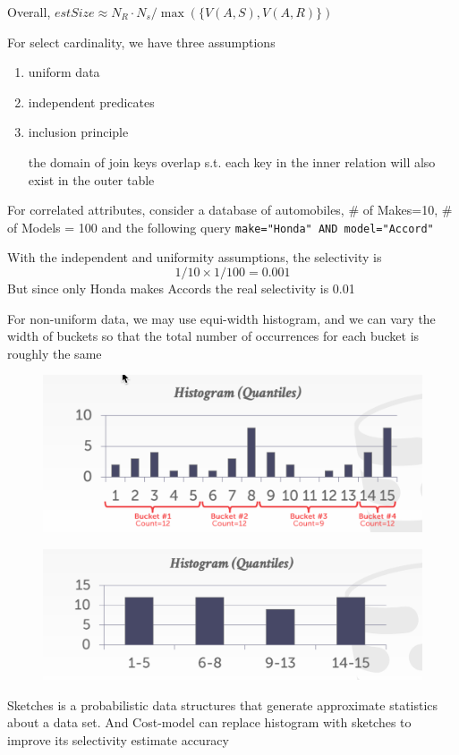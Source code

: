 \documentclass[11pt]{article}
\begin{document}
Overall, \(estSize\approx N_R\cdot N_s/\max(\{V(A,S),V(A,R)\})\)

For select cardinality, we have three assumptions
\begin{enumerate}
\item uniform data
\item independent predicates
\item inclusion principle

the domain of join keys overlap s.t. each key in the inner relation will also exist in the
outer table
\end{enumerate}


For correlated attributes, consider a database of automobiles, \# of Makes=10, \# of Models = 100
and the following query \texttt{make="Honda" AND model="Accord"}

With the independent and uniformity assumptions, the selectivity is
\begin{equation*}
1/10\times 1/100=0.001
\end{equation*}
But since only Honda makes Accords the real selectivity is 0.01

For non-uniform data, we may use equi-width histogram, and we can vary the width of buckets so
that the total number of occurrences for each bucket is roughly the same
\begin{figure}[htbp]
\centering
\includegraphics[width=.7\textwidth]{../images/15445/43.png}
\label{}
\end{figure}

\begin{figure}[htbp]
\centering
\includegraphics[width=.7\textwidth]{../images/15445/44.png}
\label{}
\end{figure}

Sketches is a probabilistic data structures that generate approximate statistics about a data
set. And Cost-model can replace histogram with sketches to improve its selectivity estimate
accuracy
\end{document}
